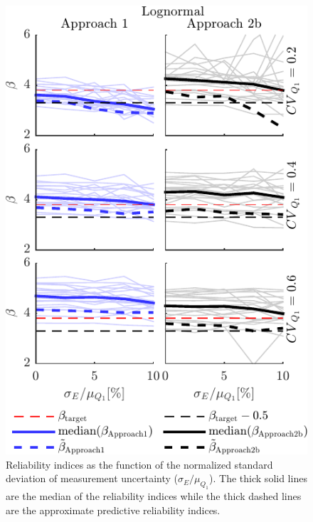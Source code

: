 \begin{figure}[htbp!]
	\includegraphics[]{Lognormal_additive_me_beta_smallm_666_median.pdf}
	\caption{Reliability indices as the function of the normalized standard deviation of measurement uncertainty ($\sigma_{E}/\mu_{Q_1}$). The thick solid lines are the median of the reliability indices while the thick dashed lines are the approximate predictive reliability indices.}
	\label{fig:Normal_lognormal_additive_me_beta_smallm}
\end{figure}

